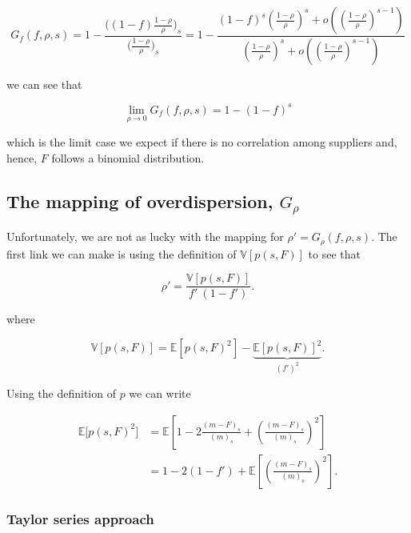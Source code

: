 \documentclass[american, abstract=on]{scrartcl}
\theoremstyle{plain}
\newcommand{\E}{\mathbb{E}}
\newcommand{\V}{\mathbb{V}}
\begin{document}
\begin{equation}
    G_f(f, \rho, s) = 1 - \frac{\Big( (1-f) \frac{1 - \rho}{\rho} \Big)_s}{\Big( \frac{1 - \rho}{\rho} \Big)_s} = 1 - \frac{(1 - f)^s \left(\frac{1 - \rho}{\rho}\right)^s + o\left(\left(\frac{1 - \rho}{\rho}\right)^{s - 1} \right) }{\left(\frac{1 - \rho}{\rho}\right)^s + o\left(\left(\frac{1 - \rho}{\rho}\right)^{s - 1} \right)}
\end{equation}

we can see that

\begin{equation}
    \lim_{\rho \rightarrow 0} G_f(f, \rho, s) = 1 - (1 - f)^s
\end{equation}

which is the limit case we expect if there is no correlation among suppliers and, hence, $F$ follows a binomial distribution.

\subsection{The mapping of overdispersion, $G_\rho$}

Unfortunately, we are not as lucky with the mapping for $\rho' = G_{\rho}(f, \rho, s)$. The first link we can make is using the definition of $\V[p(s, F)]$ to see that

\begin{equation}
    \rho' = \frac{\V[p(s, F)]}{f' \ (1 - f')}.
\end{equation}

where

\begin{equation}
    \V[p(s, F)] = \E[p(s, F)^2] - \underbrace{\E[p(s, F)]^2}_{\left(f'\right)^2}.
\end{equation}

Using the definition of $p$ we can write

\begin{equation}
    \begin{split}
        \E\big[ p(s, F)^2 \big] &= \E\left[1 - 2 \frac{(m - F)_s}{(m)_s} + \left(\frac{(m - F)_s}{(m)_s}  \right)^2\right] \\
        &= 1 - 2(1 - f') + \E\left[ \left(\frac{(m - F)_s}{(m)_s}  \right)^2 \right].
    \end{split}
\end{equation}

\iffalse
\subsubsection{Taylor series approach}
\end{document}
